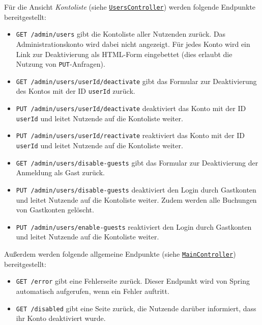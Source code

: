 Für die Ansicht \textit{Kontoliste} (siehe \hyperref[edu.kit.hci.soli.controller.UsersController]{\texttt{UsersController}}) werden folgende Endpunkte bereitgestellt:
\begin{itemize}
    \item \texttt{GET /admin/users} gibt die Kontoliste aller Nutzenden zurück. Das Administrationskonto wird dabei nicht angezeigt.
          Für jedes Konto wird ein Link zur Deaktivierung als \gls{HTML-Form} eingebettet (dies erlaubt die Nutzung von \texttt{PUT}-Anfragen).
    \item \texttt{GET /admin/users/{userId}/deactivate} gibt das Formular zur Deaktivierung des Kontos mit der ID \texttt{userId} zurück.
    \item \texttt{PUT /admin/users/{userId}/deactivate} deaktiviert das Konto mit der ID \texttt{userId} und leitet Nutzende auf die Kontoliste weiter.
    \item \texttt{PUT /admin/users/{userId}/reactivate} reaktiviert das Konto mit der ID \texttt{userId} und leitet Nutzende auf die Kontoliste weiter.
    \item \texttt{GET /admin/users/disable-guests} gibt das Formular zur Deaktivierung der Anmeldung als Gast zurück.
    \item \texttt{PUT /admin/users/disable-guests} deaktiviert den Login durch Gastkonten und leitet Nutzende auf die Kontoliste weiter.
          Zudem werden alle Buchungen von Gastkonten gelöscht.
    \item \texttt{PUT /admin/users/enable-guests} reaktiviert den Login durch Gastkonten und leitet Nutzende auf die Kontoliste weiter.
\end{itemize}

Außerdem werden folgende allgemeine Endpunkte (siehe \hyperref[edu.kit.hci.soli.controller.MainController]{\texttt{MainController}}) bereitgestellt:
\begin{itemize}
    \item \texttt{GET /error} gibt eine Fehlerseite zurück. Dieser Endpunkt wird von Spring automatisch aufgerufen, wenn ein Fehler auftritt.
    \item \texttt{GET /disabled} gibt eine Seite zurück, die Nutzende darüber informiert, dass ihr Konto deaktiviert wurde.
\end{itemize}

